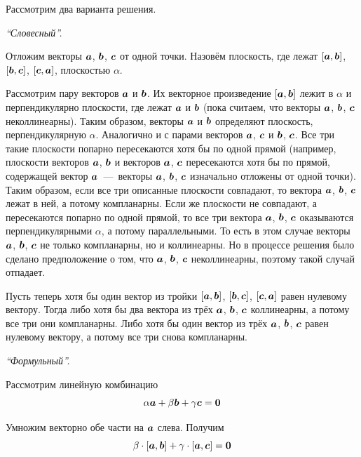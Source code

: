 \documentclass[a4paper,12pt]{article}
\begin{document}
  \begin{solution}
    Рассмотрим два варианта решения.
    
    \bigskip
    
    \emph{``Словесный''.}
    
    Отложим векторы $\boldsymbol a$, $\boldsymbol b$, $\boldsymbol c$ от одной точки.
    Назовём плоскость, где лежат $[\boldsymbol a, \boldsymbol b]$, $[\boldsymbol b, \boldsymbol c]$, $[\boldsymbol c, \boldsymbol a]$, плоскостью $\alpha$.
    
    Рассмотрим пару векторов $\boldsymbol a$ и $\boldsymbol b$.
    Их векторное произведение $[\boldsymbol a, \boldsymbol b]$ лежит в $\alpha$ и перпендикулярно плоскости, где лежат $\boldsymbol a$ и $\boldsymbol b$ (пока считаем, что векторы $\boldsymbol a$, $\boldsymbol b$, $\boldsymbol c$ неколлинеарны).
    Таким образом, векторы $\boldsymbol a$ и $\boldsymbol b$ определяют плоскость, перпендикулярную $\alpha$.
    Аналогично и с парами векторов $\boldsymbol a$, $\boldsymbol c$ и $\boldsymbol b$, $\boldsymbol c$.
    Все три такие плоскости попарно пересекаются хотя бы по одной прямой (например, плоскости векторов $\boldsymbol a$, $\boldsymbol b$ и векторов $\boldsymbol a$, $\boldsymbol c$ пересекаются хотя бы по прямой, содержащей вектор $\boldsymbol a$~---~векторы $\boldsymbol a$, $\boldsymbol b$, $\boldsymbol c$ изначально отложены от одной точки).
    Таким образом, если все три описанные плоскости совпадают, то вектора $\boldsymbol a$, $\boldsymbol b$, $\boldsymbol c$ лежат в ней, а потому компланарны.
    Если же плоскости не совпадают, а пересекаются попарно по одной прямой, то все три вектора $\boldsymbol a$, $\boldsymbol b$, $\boldsymbol c$ оказываются перпендикулярными $\alpha$, а потому параллельными.
    То есть в этом случае векторы $\boldsymbol a$, $\boldsymbol b$, $\boldsymbol c$ не только компланарны, но и коллинеарны.
    Но в процессе решения было сделано предположение о том, что $\boldsymbol a$, $\boldsymbol b$, $\boldsymbol c$ неколлинеарны, поэтому такой случай отпадает.
    
    Пусть теперь хотя бы один вектор из тройки $[\boldsymbol a, \boldsymbol b]$, $[\boldsymbol b, \boldsymbol c]$, $[\boldsymbol c, \boldsymbol a]$ равен нулевому вектору.
    Тогда либо хотя бы два вектора из трёх $\boldsymbol a$, $\boldsymbol b$, $\boldsymbol c$ коллинеарны, а потому все три они компланарны.
    Либо хотя бы один вектор из трёх $\boldsymbol a$, $\boldsymbol b$, $\boldsymbol c$ равен нулевому вектору, а потому все три снова компланарны.
    
    
    \bigskip
    
    \emph{``Формульный''.}
    
    Рассмотрим линейную комбинацию
    \[
      \alpha \boldsymbol a + \beta \boldsymbol b + \gamma \boldsymbol c = \boldsymbol 0
    \]
    
    Умножим векторно обе части на $\boldsymbol a$ слева.
    Получим
    \[
      \beta \cdot [\boldsymbol a, \boldsymbol b] + \gamma \cdot [\boldsymbol a, \boldsymbol c] = \boldsymbol 0
    \]
    

\end{solution}
\end{document}
